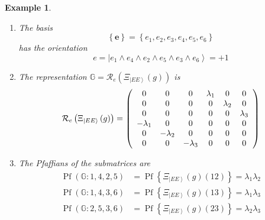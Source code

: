 \documentclass[aps,preprint]{revtex4}%
\newtheorem{example}[theorem]{Example}
\begin{document}
\begin{example}
\begin{enumerate}
\begin{gather}
\lambda_{2}+\left(  e_{1}\wedge e_{4}\wedge e_{3}\wedge e_{6}\right)
\lambda_{1}\lambda_{3}+\left(  e_{2}\wedge e_{5}\wedge e_{3}\wedge
e_{6}\right)  \lambda_{2}\lambda_{3}\\
\parallel\\
\left(  e_{1}\wedge e_{4}\wedge e_{2}\wedge e_{5}\right)  \operatorname{Pf}%
\left\{  \Xi_{\left\vert EE\right\rangle }\left(  g\right)  \left(  12\right)
\right\}  +\left(  e_{1}\wedge e_{4}\wedge e_{3}\wedge e_{6}\right)
\operatorname{Pf}\left\{  \Xi_{\left\vert EE\right\rangle }\left(  g\right)
\left(  13\right)  \right\}  +\left(  e_{2}\wedge e_{5}\wedge e_{3}\wedge
e_{6}\right)  \operatorname{Pf}\left\{  \Xi_{\left\vert EE\right\rangle
}\left(  g\right)  \left(  23\right)  \right\}
\end{gather}


\item The basis
\begin{equation}
\left\{  \mathbf{e}\right\}  =\left\{  e_{1},e_{2},e_{3},e_{4},e_{5}%
,e_{6}\right\}
\end{equation}
has the orientation
\begin{equation}
e=\left\vert e_{1}\wedge e_{4}\wedge e_{2}\wedge e_{5}\wedge e_{3}\wedge
e_{6}\right\rangle =+1
\end{equation}


\item The representation $\mathbb{G}=\mathcal{R}_{e}\left(  \Xi_{\left\vert
EE\right\rangle }\left(  g\right)  \right)  $ is
\begin{equation}
\mathcal{R}_{e}\left(  \Xi_{\left\vert EE\right\rangle }\left(  g\right)
\right)  =\left(
\begin{array}
[c]{cccccc}%
0 & 0 & 0 & \lambda_{1} & 0 & 0\\
0 & 0 & 0 & 0 & \lambda_{2} & 0\\
0 & 0 & 0 & 0 & 0 & \lambda_{3}\\
-\lambda_{1} & 0 & 0 & 0 & 0 & 0\\
0 & -\lambda_{2} & 0 & 0 & 0 & 0\\
0 & 0 & -\lambda_{3} & 0 & 0 & 0
\end{array}
\right)
\end{equation}


\item The Pfaffians of the submatrices are
\begin{align}
\operatorname{Pf}\left(  \mathbb{G}:1,4,2,5\right)   &  =\operatorname{Pf}%
\left\{  \Xi_{\left\vert EE\right\rangle }\left(  g\right)  \left(  12\right)
\right\}  =\lambda_{1}\lambda_{2}\\
\operatorname{Pf}\left(  \mathbb{G}:1,4,3,6\right)   &  =\operatorname{Pf}%
\left\{  \Xi_{\left\vert EE\right\rangle }\left(  g\right)  \left(  13\right)
\right\}  =\lambda_{1}\lambda_{3}\\
\operatorname{Pf}\left(  \mathbb{G}:2,5,3,6\right)   &  =\operatorname{Pf}%
\left\{  \Xi_{\left\vert EE\right\rangle }\left(  g\right)  \left(  23\right)
\right\}  =\lambda_{2}\lambda_{3}%
\end{align}

\end{enumerate}
\end{example}
\end{document}
